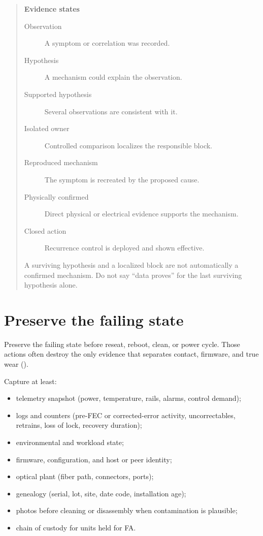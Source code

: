 \begin{quote}
\noindent\textbf{Evidence states}\\[0.35em]
\begin{description}
\item[Observation] A symptom or correlation was recorded.
\item[Hypothesis] A mechanism could explain the observation.
\item[Supported hypothesis] Several observations are consistent with it.
\item[Isolated owner] Controlled comparison localizes the responsible block.
\item[Reproduced mechanism] The symptom is recreated by the proposed cause.
\item[Physically confirmed] Direct physical or electrical evidence supports the
      mechanism.
\item[Closed action] Recurrence control is deployed and shown effective.
\end{description}
A surviving hypothesis and a localized block are not automatically a confirmed
mechanism. Do not say ``data proves'' for the last surviving hypothesis alone.
\end{quote}

\section{Preserve the failing state}
\label{sec:fa-preserve}

Preserve the failing state before reseat, reboot, clean, or power cycle. Those
actions often destroy the only evidence that separates contact, firmware, and
true wear ().

Capture at least:

\begin{itemize}
\item telemetry snapshot (power, temperature, rails, alarms, control demand);
\item logs and counters (pre-FEC or corrected-error activity, uncorrectables,
      retrains, loss of lock, recovery duration);
\item environmental and workload state;
\item firmware, configuration, and host or peer identity;
\item optical plant (fiber path, connectors, ports);
\item genealogy (serial, lot, site, date code, installation age);
\item photos before cleaning or disassembly when contamination is plausible;
\item chain of custody for units held for FA.
\end{itemize}

